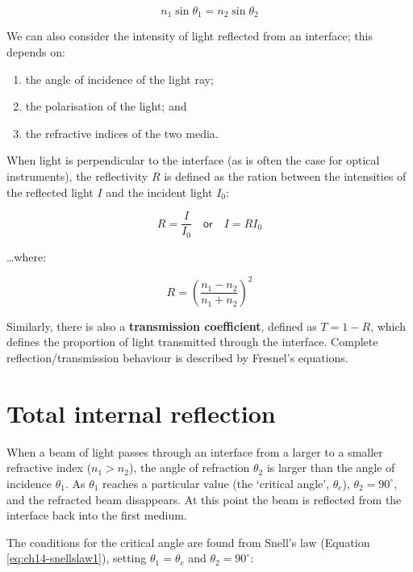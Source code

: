 \documentclass[
]{book}
\providecommand{\tightlist}{%
  \setlength{\itemsep}{0pt}\setlength{\parskip}{0pt}}
\begin{document}
\begin{equation}
n_1 \sin \theta_1 = n_2 \sin \theta_2
\label{eq:ch14-snellslaw1}
\end{equation}

We can also consider the intensity of light reflected from an interface; this depends on:

\begin{enumerate}
\def\labelenumi{\arabic{enumi}.}
\tightlist
\item
  the angle of incidence of the light ray;
\item
  the polarisation of the light; and
\item
  the refractive indices of the two media.
\end{enumerate}

When light is perpendicular to the interface (as is often the case for optical instruments), the reflectivity \(R\) is defined as the ration between the intensities of the reflected light \(I\) and the incident light \(I_0\):

\begin{equation}
R = \frac{I}{I_0} \quad \textsf{or} \quad I = R I_0
\end{equation}

\ldots where:

\begin{equation}
R = \left( \frac{n_1 - n_2}{n_1 + n_2} \right)^2
\end{equation}

Similarly, there is also a \textbf{transmission coefficient}, defined as \(T = 1-R\), which defines the proportion of light transmitted through the interface. Complete reflection/transmission behaviour is described by Fresnel's equations.

\hypertarget{sec-ch14-internalreflection}{%
\section{Total internal reflection}\label{sec-ch14-internalreflection}}

When a beam of light passes through an interface from a larger to a smaller refractive index (\(n_1 > n_2\)), the angle of refraction \(\theta_2\) is larger than the angle of incidence \(\theta_1\). As \(\theta_1\) reaches a particular value (the `critical angle', \(\theta_c\)), \(\theta_2 = 90^\circ\), and the refracted beam disappears. At this point the beam is reflected from the interface back into the first medium.

The conditions for the critical angle are found from Snell's law (Equation \eqref{eq:ch14-snellslaw1}), setting \(\theta_1 = \theta_c\) and \(\theta_2 = 90^\circ\):
\end{document}
